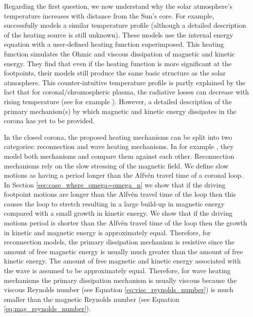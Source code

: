Regarding the first question, we now understand why the solar atmosphere's temperature increases with distance from the Sun's core. For example, \citet{Martens2010} successfully models a similar temperature profile  (although a detailed description of the heating source is still unknown). These models use the internal energy equation with a user-defined heating function superimposed. This heating function simulates the Ohmic and viscous dissipation of magnetic and kinetic energy. They find that even if the heating function is more significant at the footpoints, their models still produce the same basic structure as the solar atmosphere. This counter-intuitive temperature profile is partly explained by the fact that for coronal/chromospheric plasma, the radiative losses can decrease with rising temperature (see for example \citealt{Klimchuck2008}).
However, a detailed description of the primary mechanism(s) by which magnetic and kinetic energy dissipates in the corona has yet to be provided.

In the closed corona, the proposed heating mechanisms can be split into two categories: reconnection and wave heating mechanisms. In for example \citet{vanBallegooijen2011}, \citet{Howson2020} they model both mechanisms and compare them against each other. Reconnection mechanisms rely on the slow stressing of the magnetic field. We define slow motions as having a period longer than the Alfv\'en travel time of a coronal loop. In Section \ref{sec:case_where_omega=omega_n} we show that if the driving footpoint motions are longer than the Alfv\'en travel time of the loop then this causes the loop to stretch resulting in a large build-up in magnetic energy compared with a small growth in kinetic energy. We show that if the driving motions period is shorter than the Alfv\'en travel time of the loop then the growth in kinetic and magnetic energy is approximately equal. Therefore, for reconnection models, the primary dissipation mechanism is resistive since the amount of free magnetic energy is usually much greater than the amount of free kinetic energy. The amount of free magnetic and kinetic energy associated with the wave is assumed to be approximately equal. Therefore, for wave heating mechanisms the primary dissipation mechanism is usually viscous because the viscous Reynolds number (see Equation \ref{eq:visc_reynolds_number}) is much smaller than the magnetic Reynolds number (see Equation \ref{eq:mag_reynolds_number}).


